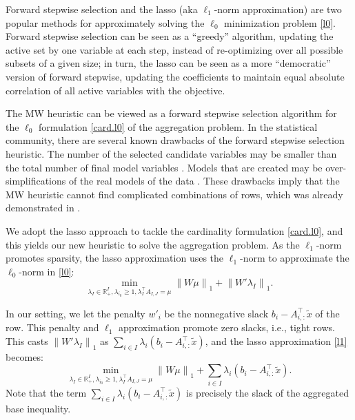 \documentclass[a4paper,UKenglish,cleveref, autoref,  thm-restate]{lipics-v2021}
\def\ie{{i.e.,} }
\newcommand{\bR}{\mathbb{R}}
\newcommand{\norm}[1]{{\lVert#1\rVert}}
\newcommand{\relx}[1]{\tilde{#1}}
\begin{document}
	
	Forward stepwise selection \cite{draper1998applied,hastie2017extended} and the lasso \cite{tibshirani1996regression,chen2001atomic} (aka $\ell_1$-norm approximation) are two popular methods for approximately solving the $\ell_0$ minimization problem \eqref{l0}. Forward stepwise selection can be seen as a ``greedy'' algorithm, updating the active set by one variable at each step, instead of re-optimizing over all possible subsets of a given size; in turn, the lasso can be seen as a more “democratic” version of forward stepwise, updating the coefficients to maintain equal absolute correlation of all active variables with the objective.
	
	
	The MW heuristic can be viewed as a forward stepwise selection algorithm for the $\ell_0$ formulation \eqref{card.l0}
	of the aggregation problem. In the statistical community, there are several known drawbacks of the forward stepwise selection heuristic. The number of the selected candidate variables may be smaller than the total number of final model variables \cite{hurvich1990impact}. Models that are created may be over-simplifications of the real models of the data \cite{roecker1991prediction}. These drawbacks imply that the MW heuristic cannot find complicated combinations of rows, which was already demonstrated in .
	
	
	We adopt the lasso approach to tackle the cardinality formulation \eqref{card.l0}, %
	and this yields our new heuristic to solve the aggregation problem. As  the  $\ell_1$-norm promotes sparsity, the lasso  approximation uses the $\ell_1$-norm to approximate the $\ell_0$-norm in \eqref{l0}:
	\begin{equation}
		\label{l1}
		\min_{\lambda_I \in \bR^I_+, \lambda_{i_0} \ge 1, \lambda_I^\top A_{I,J} = \mu }  \norm{ W \mu}_1 +  \norm{ W'  \lambda_I}_1.
	\end{equation}
	
	
	
	
	In our setting,  we let the penalty $w'_i$ be the nonnegative slack $ b_i - A_{i,:}^\top \relx{x}$ of the row. This penalty and $\ell_1$ approximation promote zero slacks, \ie tight rows.   This casts $\norm{ W'  \lambda_I}_1$ as $\sum_{i \in I}\lambda_i (b_i - A_{i,:}^\top \relx{x})$, and the  lasso approximation \eqref{l1} becomes:
	\begin{equation}
		\label{eq.lasso}
		\min_{\lambda_I \in \bR^I_+, \lambda_{i_0} \ge 1, \lambda_I^\top A_{I,J} = \mu }  \norm{ W \mu}_1 + \sum_{i \in I}\lambda_i (b_i - A_{i,:}^\top \relx{x}).
	\end{equation}
	Note that the term $\sum_{i \in I}\lambda_i (b_i - A_{i,:}^\top \relx{x})$ is precisely the slack of the aggregated base inequality.%
	
\end{document}
